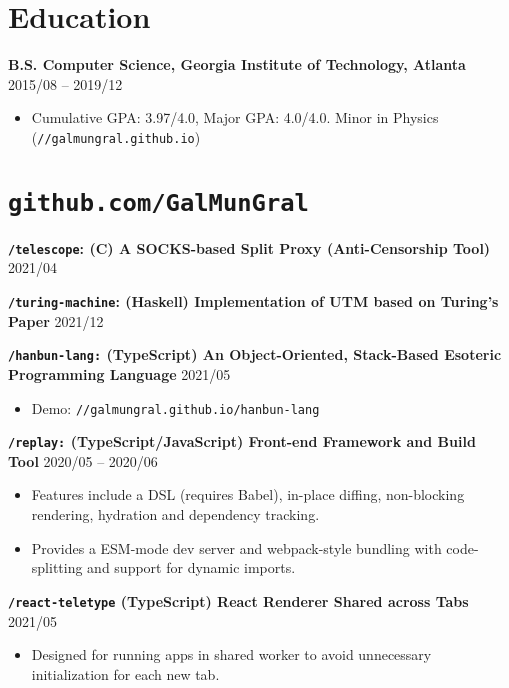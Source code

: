 \documentclass[10pt]{article}
\begin{document}
\section*{Education}
\textbf{B.S. Computer Science, Georgia Institute of Technology, Atlanta} \hfill 2015/08 -- 2019/12
\begin{itemize}
\item  Cumulative GPA: 3.97/4.0, Major GPA: 4.0/4.0. Minor in Physics (\texttt{//galmungral.github.io})
\end{itemize} 

\section*{\texttt{\large github.com/GalMunGral}}

\textbf{\texttt{/telescope}:  (C) A SOCKS-based Split Proxy (Anti-Censorship Tool)}   \hfill 2021/04

\vspace{0.5em}
\textbf{\texttt{/turing-machine}:  (Haskell) Implementation of UTM based on Turing's Paper} \hfill 2021/12

\vspace{0.5em}
\textbf{\texttt{/hanbun-lang:} (TypeScript) An Object-Oriented, Stack-Based Esoteric Programming Language} \hfill 2021/05
\begin{itemize}
\item Demo: \texttt{//galmungral.github.io/hanbun-lang}
\end{itemize}

\vspace{0.5em}
\textbf{\texttt{/replay:} (TypeScript/JavaScript) Front-end Framework and Build Tool} \hfill 2020/05 -- 2020/06
\begin{itemize}
\item Features include a DSL (requires Babel), in-place diffing, non-blocking rendering, hydration and dependency tracking.
\item Provides a ESM-mode dev server and webpack-style bundling with code-splitting and support for dynamic imports.
\end{itemize}

\vspace{0.5em}
\textbf{\texttt{/react-teletype}  (TypeScript) React Renderer Shared across Tabs} \hfill 2021/05 
\begin{itemize}
\item Designed for running apps in shared worker to avoid unnecessary initialization for each new tab.
\end{itemize}
\end{document}
